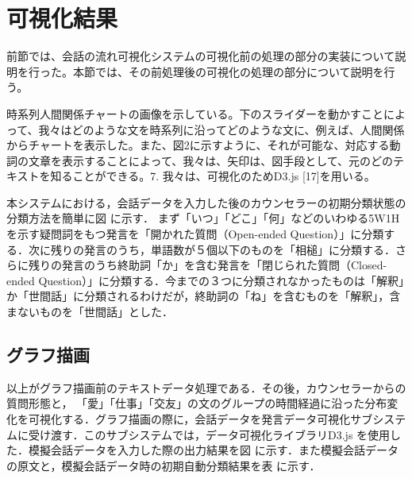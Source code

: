 \documentclass[shuuron]{kuee}
\begin{document}
\section{可視化結果}

前節では、会話の流れ可視化システムの可視化前の処理の部分の実装について説明を行った。本節では、その前処理後の可視化の処理の部分について説明を行う。



時系列人間関係チャートの画像を示している。下のスライダーを動かすことによって、我々はどのような文を時系列に沿ってどのような文に、例えば、人間関係からチャートを表示した。また、図2に示すように、それが可能な、対応する動詞の文章を表示することによって、我々は、矢印は、図手段として、元のどのテキストを知ることができる。7. 我々は、可視化のためD3.js [17]を用いる。



本システムにおける，会話データを入力した後のカウンセラーの初期分類状態の分類方法を簡単に図
に示す．
まず「いつ」「どこ」「何」などのいわゆる5W1Hを示す疑問詞をもつ発言を「開かれた質問（Open-ended Question）」に分類する．次に残りの発言のうち，単語数が５個以下のものを「相槌」に分類する．さらに残りの発言のうち終助詞「か」を含む発言を「閉じられた質問（Closed-ended Question）」に分類する．今までの３つに分類されなかったものは「解釈」か「世間話」に分類されるわけだが，終助詞の「ね」を含むものを「解釈」，含まないものを「世間話」とした．

\subsection{グラフ描画}
以上がグラフ描画前のテキストデータ処理である．その後，カウンセラーからの質問形態と， 「愛」「仕事」「交友」の文のグループの時間経過に沿った分布変化を可視化する．グラフ描画の際に，会話データを発言データ可視化サブシステムに受け渡す．このサブシステムでは，データ可視化ライブラリD3.js
を使用した．模擬会話データを入力した際の出力結果を図
に示す．また模擬会話データの原文と，模擬会話データ時の初期自動分類結果を表
に示す．
%
\end{document}
